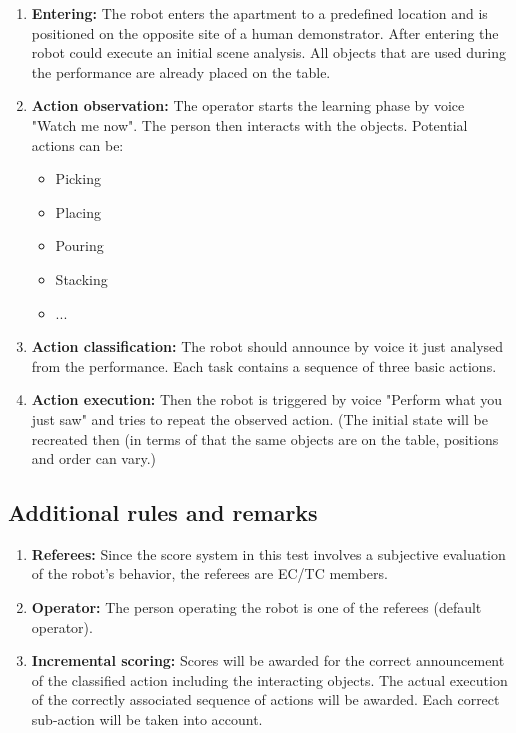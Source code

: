 \begin{enumerate}
\item \textbf{Entering:} The robot enters the apartment to a predefined location 
	and is positioned on the opposite site of a human demonstrator. After entering 
	the robot could execute an initial scene analysis. All objects that are used 
	during the performance are already placed on the table.

	\item \textbf{Action observation:} The operator starts the learning phase 
		by voice "Watch me now". The person then interacts with the objects. Potential
		actions can be: \\
		\begin{itemize}
			\item Picking
			\item Placing
			\item Pouring
			\item Stacking
			\item ...
		\end{itemize}

	\item \textbf{Action classification:} The robot should announce by voice it just analysed
		from the performance. Each task contains a sequence of three basic actions.

	\item \textbf{Action execution:} Then the robot is triggered by voice "Perform what you just saw"
		and tries to repeat the observed action. (The initial state will be recreated then (in terms of that 
		the same objects are on the table, positions and order can vary.)

\end{enumerate}

\subsection{Additional rules and remarks}
\label{sec:imitation_remarks}
\begin{enumerate}
	\item \textbf{Referees:} Since the score system in this test involves a 
		subjective evaluation of the robot's behavior, the referees are EC/TC members.

	\item \textbf{Operator:} The person operating the robot is one of the 
		referees (default operator).

	\item \textbf{Incremental scoring:} Scores will be awarded for the correct
		announcement of the classified action including the interacting objects.
		The actual execution of the correctly associated sequence of actions 
		will be awarded. Each correct sub-action will be taken into account.
\end{enumerate}

